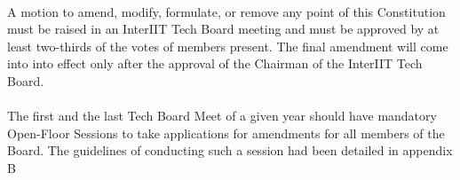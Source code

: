 
\paragraph{}
A motion to amend, modify, formulate, or remove any point of this Constitution must be raised in an InterIIT Tech Board meeting and must be approved by at least two-thirds of the votes of members present. The final amendment will come into into effect only after the approval of the Chairman of the InterIIT Tech Board.

\paragraph{}
The first and the last Tech Board Meet of a given year should have mandatory Open-Floor Sessions to take applications for amendments for all members of the Board. The guidelines of conducting such a session had been detailed in appendix B

